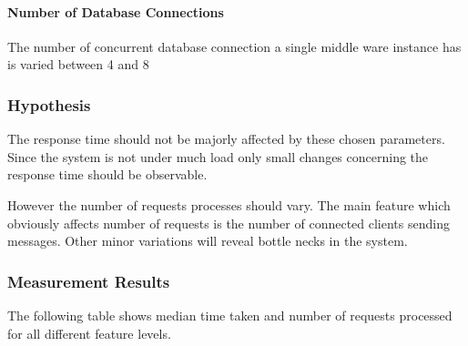 \documentclass[milestone1.tex]{subfiles}
\begin{document}
\paragraph{Number of Database Connections}

The number of concurrent database connection a single middle ware instance has is varied between 4 and 8

\subsubsection{Hypothesis}

The response time should not be majorly affected by these chosen parameters. Since the system is not under much load only small changes concerning the response time should be observable.

However the number of requests processes should vary. The main feature which obviously affects number of requests is the number of connected clients sending messages. Other minor variations will reveal bottle necks in the system.

\subsubsection{Measurement Results}
The following table shows median time taken and number of requests processed for all different feature levels.\\
\end{document}
